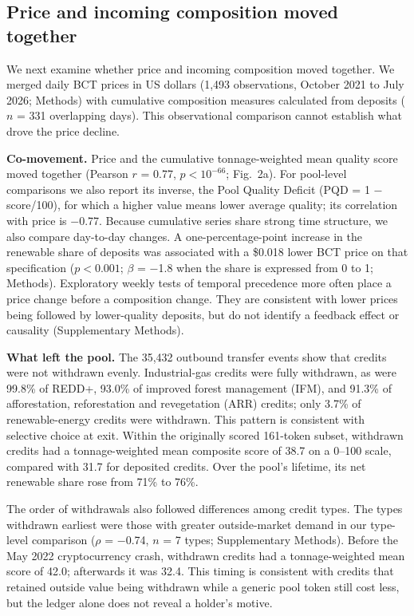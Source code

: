 \documentclass[sn-nature,Numbered]{sn-jnl}
\begin{document}
\subsection*{Price and incoming composition moved together}

We next examine whether price and incoming composition moved together. We merged daily BCT prices in US dollars (1,493 observations, October 2021 to July 2026; Methods) with cumulative composition measures calculated from deposits ($n$ = 331 overlapping days). This observational comparison cannot establish what drove the price decline.

\textbf{Co-movement.} Price and the cumulative tonnage-weighted mean quality score moved together (Pearson $r$ = 0.77, $p < 10^{-66}$; Fig.~2a). For pool-level comparisons we also report its inverse, the Pool Quality Deficit (PQD = 1 $-$ score/100), for which a higher value means lower average quality; its correlation with price is $-$0.77. Because cumulative series share strong time structure, we also compare day-to-day changes. A one-percentage-point increase in the renewable share of deposits was associated with a \$0.018 lower BCT price on that specification ($p < 0.001$; $\beta$ = $-$1.8 when the share is expressed from 0 to 1; Methods). Exploratory weekly tests of temporal precedence more often place a price change before a composition change. They are consistent with lower prices being followed by lower-quality deposits, but do not identify a feedback effect or causality (Supplementary Methods).

\textbf{What left the pool.} The 35,432 outbound transfer events show that credits were not withdrawn evenly. Industrial-gas credits were fully withdrawn, as were 99.8\% of REDD+, 93.0\% of improved forest management (IFM), and 91.3\% of afforestation, reforestation and revegetation (ARR) credits; only 3.7\% of renewable-energy credits were withdrawn. This pattern is consistent with selective choice at exit. Within the originally scored 161-token subset, withdrawn credits had a tonnage-weighted mean composite score of 38.7 on a 0--100 scale, compared with 31.7 for deposited credits. Over the pool's lifetime, its net renewable share rose from 71\% to 76\%.

The order of withdrawals also followed differences among credit types. The types withdrawn earliest were those with greater outside-market demand in our type-level comparison ($\rho$ = $-$0.74, $n$ = 7 types; Supplementary Methods). Before the May 2022 cryptocurrency crash, withdrawn credits had a tonnage-weighted mean score of 42.0; afterwards it was 32.4. This timing is consistent with credits that retained outside value being withdrawn while a generic pool token still cost less, but the ledger alone does not reveal a holder's motive.
\end{document}
